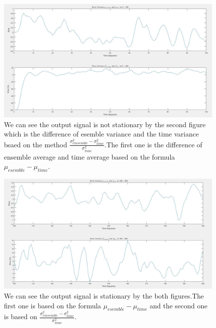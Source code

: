 \documentclass[12pt,a4paper]{article}
\begin{document}
				\begin{figure}[H]
					\centering
					\includegraphics[scale=0.4]{Problem3c}
					\caption[Ensemble average and essemble variance with nostationary part]{We can see the output signal is not stationary by the second figure which is the difference of esemble variance and the time variance bsaed on the method $\frac{\sigma^{2}_{emsemble}-\sigma^{2}_{time}}{\sigma^{2}_{time}}$.The first one is the difference of ensemble average and time average based on the formula $\mu_{esemble}-\mu_{time}$.}
				\end{figure}
			\begin{figure}[H]
				\centering
				\includegraphics[scale=0.4]{Problem3d}
				\caption[Ensemble average and essemble variance with stationary part]{We can see the output signal is stationary by the both figures.The first one is based on the formula $\mu_{esemble}-\mu_{time}$ and the second one is based on $\frac{\sigma^{2}_{emsemble}-\sigma^{2}_{time}}{\sigma^{2}_{time}}$.}
			\end{figure}
\end{document}
